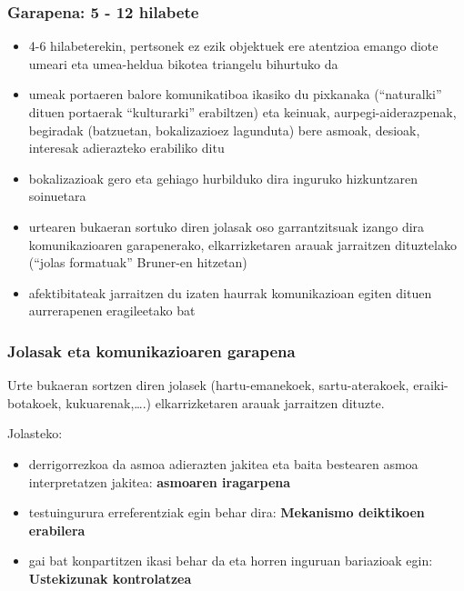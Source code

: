 \documentclass[
]{book}
\providecommand{\tightlist}{%
  \setlength{\itemsep}{0pt}\setlength{\parskip}{0pt}}
\begin{document}
\hypertarget{garapena-5---12-hilabete}{%
\subsubsection{Garapena: 5 - 12 hilabete}\label{garapena-5---12-hilabete}}

\begin{itemize}
\tightlist
\item
  4-6 hilabeterekin, pertsonek ez ezik objektuek ere atentzioa emango diote umeari eta umea-heldua bikotea triangelu bihurtuko da\\
\item
  umeak portaeren balore komunikatiboa ikasiko du pixkanaka (``naturalki'' dituen portaerak ``kulturarki'' erabiltzen) eta keinuak, aurpegi-aiderazpenak, begiradak (batzuetan, bokalizazioez lagunduta) bere asmoak, desioak, interesak adierazteko erabiliko ditu
\item
  bokalizazioak gero eta gehiago hurbilduko dira inguruko hizkuntzaren soinuetara\\
\item
  urtearen bukaeran sortuko diren jolasak oso garrantzitsuak izango dira komunikazioaren garapenerako, elkarrizketaren arauak jarraitzen dituztelako (``jolas formatuak'' Bruner-en hitzetan)\\
\item
  afektibitateak jarraitzen du izaten haurrak komunikazioan egiten dituen aurrerapenen eragileetako bat
\end{itemize}

\hypertarget{jolasak-eta-komunikazioaren-garapena}{%
\subsubsection{Jolasak eta komunikazioaren garapena}\label{jolasak-eta-komunikazioaren-garapena}}

Urte bukaeran sortzen diren jolasek (hartu-emanekoek, sartu-aterakoek, eraiki-botakoek, kukuarenak,\ldots.) elkarrizketaren arauak jarraitzen dituzte.

Jolasteko:

\begin{itemize}
\tightlist
\item
  derrigorrezkoa da asmoa adierazten jakitea eta baita bestearen asmoa interpretatzen jakitea: \textbf{asmoaren iragarpena}
\item
  testuingurura erreferentziak egin behar dira: \textbf{Mekanismo deiktikoen erabilera}
\item
  gai bat konpartitzen ikasi behar da eta horren inguruan bariazioak egin: \textbf{Ustekizunak kontrolatzea}
\end{itemize}
\end{document}
